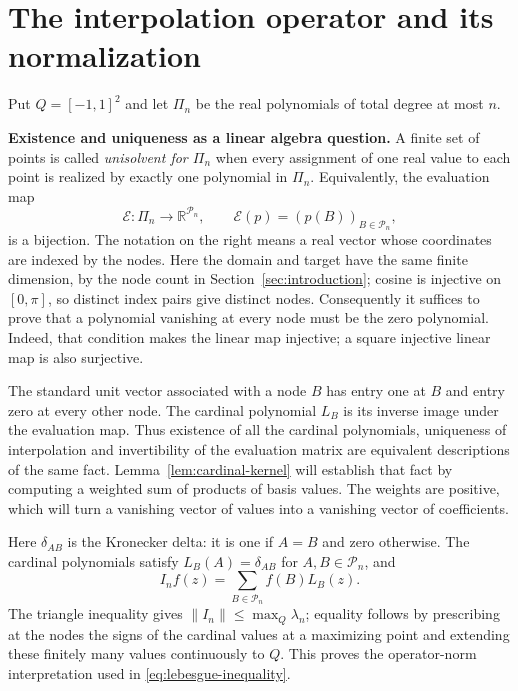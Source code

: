 \section{The interpolation operator and its normalization}\label{sec:preliminaries}
Put $Q=[-1,1]^2$ and let $\Pi_n$ be the real polynomials of total degree
at most $n$.

\noindent\textbf{Existence and uniqueness as a linear algebra question.}
A finite set of points is called \emph{unisolvent for $\Pi_n$} when
every assignment of one real value to each point is realized by exactly
one polynomial in $\Pi_n$. Equivalently, the evaluation map
\[
 \mathcal E:\Pi_n\longrightarrow\mathbb R^{\mathcal P_n},
 \qquad \mathcal E(p)=(p(B))_{B\in\mathcal P_n},
\]
is a bijection. The notation on the right means a real vector whose
coordinates are indexed by the nodes. Here the domain and target have
the same finite dimension, by the node count in Section~\ref{sec:introduction};
cosine is injective on $[0,\pi]$, so distinct index pairs give distinct nodes.
Consequently it suffices to prove that a
polynomial vanishing at every node must be the zero polynomial. Indeed,
that condition makes the linear map injective; a square injective
linear map is also surjective.

The standard unit vector associated with a node $B$ has entry one at
$B$ and entry zero at every other node. The cardinal polynomial $L_B$
is its inverse image under the evaluation map. Thus existence of all
the cardinal polynomials,
uniqueness of interpolation and invertibility of the evaluation matrix
are equivalent descriptions of the same fact. Lemma~\ref{lem:cardinal-kernel}
will establish that fact by computing a weighted sum of products of
basis values. The weights are positive, which will turn a vanishing
vector of values into a vanishing vector of coefficients.

Here $\delta_{AB}$ is the Kronecker delta: it is one if $A=B$ and zero
otherwise. The cardinal polynomials satisfy $L_B(A)=\delta_{AB}$ for
$A,B\in\mathcal P_n$, and
\[
 I_nf(z)=\sum_{B\in\mathcal P_n} f(B)L_B(z).
\]
The triangle inequality gives $\|I_n\|\leq\max_Q\lambda_n$; equality
follows by prescribing at the nodes the signs of the cardinal values
at a maximizing point and extending these finitely many values
continuously to $Q$. This proves the operator-norm interpretation used
in \eqref{eq:lebesgue-inequality}.

